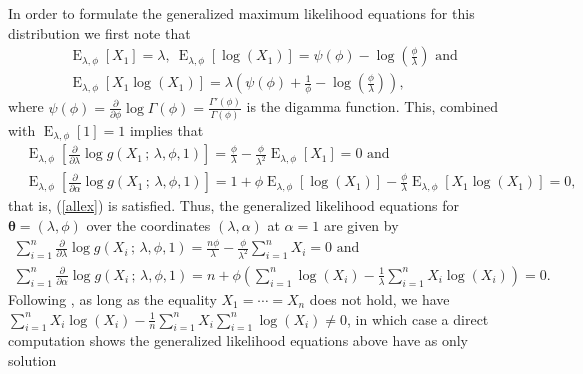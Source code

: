 \documentclass[10pt,a4paper,onecolumn]{article} %
\newcommand{\bs}{\boldsymbol}
\newcommand{\on}{\operatorname}
\begin{document}
In order to formulate the generalized maximum likelihood equations for this distribution we first note that
\begin{equation}\label{relations}
\begin{aligned}
&
\on{E}_{\lambda,\phi}\left[X_1\right]=\lambda,\
\on{E}_{\lambda,\phi}\left[\log(X_1)\right]=\psi(\phi)-\log\left(\frac{\phi}{\lambda}\right)\mbox{ and }\\
&\on{E}_{\lambda,\phi}\left[X_1\log(X_1)\right]=\lambda \left(\psi(\phi)+\frac{1}{\phi} - \log\left(\frac{\phi}{\lambda}\right)\right),
\end{aligned}
\end{equation}
where $\psi(\phi)=\frac{\partial}{\partial \phi}\log\Gamma(\phi)=\frac{\Gamma'(\phi)}{\Gamma(\phi)}$ is the digamma function. This, combined with $\on{E}_{\lambda,\phi}[1]=1$ implies that
\begin{equation*}
\begin{aligned}
&\on{E}_{\lambda,\phi} \left[\frac{\partial}{\partial \lambda}  \log g(X_1\,;\,\lambda,\phi,1)\right] = \frac{\phi}{\lambda} - \frac{\phi}{\lambda^2} \on{E}_{\lambda,\phi}\left[X_1\right]=0\mbox{ and}\\
&\on{E}_{\lambda,\phi} \left[\frac{\partial}{\partial \alpha}  \log g(X_1\,;\,\lambda,\phi,1)\right] = 1 + \phi\on{E}_{\lambda,\phi}\left[ \log\left(X_1\right)\right] - \frac{\phi}{\lambda} \on{E}_{\lambda,\phi}\left[ X_1 \log\left(X_1\right)\right] =0,
\end{aligned}
\end{equation*}
that is, (\ref{allex}) is satisfied. Thus, the generalized likelihood equations for $\bs{\theta}=(\lambda,\phi)$ over the coordinates $(\lambda,\alpha)$ at $\alpha=1$ are given by
\begin{equation*}\label{closmdfy2}
\begin{aligned}
\sum_{i=1}^n \frac{\partial}{\partial \lambda}  \log g(X_i\,;\,\lambda,\phi,1) = \frac{n\phi}{\lambda}-\frac{\phi}{\lambda^2}\sum_{i=1}^n{X_i}=0\mbox{ and}\\
\sum_{i=1}^n \frac{\partial}{\partial \alpha}  \log g(X_i\,;\,\lambda,\phi,1) = n + \phi\left(\sum_{i=1}^n \log\left(X_i\right)-\frac{1}{\lambda} \sum_{i=1}^{n}X_i \log\left(X_i\right)\right) = 0.
\end{aligned}
\end{equation*}
Following \cite{louzada2019note}, as long as the equality $X_1=\cdots=X_n$ does not hold, we have $\sum_{i=1}^n X_i \log\left(X_i\right) -\frac{1}{n}\sum_{i=1}^n X_i\sum_{i=1}^n \log\left(X_i\right)\neq 0$, in which case a direct computation shows the generalized likelihood equations above have as only solution
\end{document}
